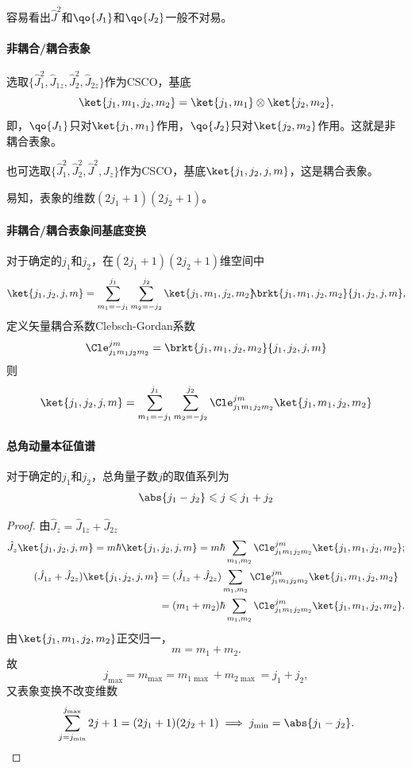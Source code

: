 容易看出$\hat J^2$和$\qo{J_1}$和$\qo{J_2}$一般不对易。
\paragraph{非耦合/耦合表象}选取$\{\hat J_1^2,\hat J_{1z},\hat J_2^2,\hat J_{2z}\}$作为CSCO，基底
\[
	\ket{j_1,m_1,j_2,m_2}=\ket{j_1,m_1}\otimes\ket{j_2,m_2},
\]
即，$\qo{J_1}$只对$\ket{j_1,m_1}$作用，$\qo{J_2}$只对$\ket{j_2,m_2}$作用。这就是非耦合表象。

也可选取$\{\hat J_1^2,\hat J_2^2,\hat J^2,\hat J_z\}$作为CSCO，基底$\ket{j_1,j_2,j,m}$，这是耦合表象。

易知，表象的维数$(2j_1+1)(2j_2+1)$。

\paragraph{非耦合/耦合表象间基底变换}对于确定的$j_1$和$j_2$，在$(2j_1+1)(2j_2+1)$维空间中
\begin{align*}
	\ket{j_1,j_2,j,m}=\sum_{m_1=-j_1}^{j_1}\sum_{m_2=-j_2}^{j_2}\ket{j_1,m_1,j_2,m_2}\hspace{-3pt}\brkt{j_1,m_1,j_2,m_2}{j_1,j_2,j,m},
\end{align*}
定义矢量耦合系数Clebsch-Gordan系数
\[
	\Cle_{j_1m_1j_2m_2}^{jm}=\brkt{j_1,m_1,j_2,m_2}{j_1,j_2,j,m}
\]
则
\begin{align}
	\ket{j_1,j_2,j,m}=\sum_{m_1=-j_1}^{j_1}\sum_{m_2=-j_2}^{j_2}\Cle_{j_1m_1j_2m_2}^{jm}\ket{j_1,m_1,j_2,m_2}
\end{align}
\paragraph{总角动量本征值谱}对于确定的$j_1$和$j_2$，总角量子数$j$的取值系列为
\begin{align}
	\abs{j_1-j_2}\leqslant j\leqslant j_1+j_2
\end{align}
\begin{proof}
	由$\hat J_z=\hat J_{1z}+\hat J_{2z}$
	\begin{align*}
		\hat J_z\ket{j_1,j_2,j,m}=m\hbar\ket{j_1,j_2,j,m}=m\hbar\sum_{m_1,m_2}\Cle_{j_1m_1j_2m_2}^{jm}\ket{j_1,m_1,j_2,m_2};\\
		\begin{aligned}
			(\hat J_{1z}+\hat J_{2z})\ket{j_1,j_2,j,m}&=(\hat J_{1z}+\hat J_{2z})\sum_{m_1,m_2}\Cle_{j_1m_1j_2m_2}^{jm}\ket{j_1,m_1,j_2,m_2}\\
			&=(m_1+m_2)\hbar\sum_{m_1,m_2}\Cle_{j_1m_1j_2m_2}^{jm}\ket{j_1,m_1,j_2,m_2}.
		\end{aligned}
	\end{align*}
	由$\ket{j_1,m_1,j_2,m_2}$正交归一，
	\[
	m=m_1+m_2.
	\]%
	故
	\[
	j_{\max}=m_{\max}=m_{1\max}+m_{2\max}=j_1+j_2,
	\]
	又表象变换不改变维数
	\[
		\sum_{j=j_{\min}}^{j_{\max}}2j+1=(2j_1+1)(2j_2+1)\implies j_{\min}=\abs{j_1-j_2}.
	\]
\end{proof}
